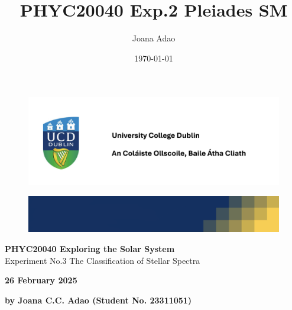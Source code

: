 \documentclass[12pt]{article}
\title{PHYC20040 Exp.2 Pleiades SM}
\author{Joana Adao}
\date{\today}
\begin{document}
\begin{titlepage}
    \begin{center}

        \begin{figure}[ht]
            \includegraphics[width=\textwidth]{UCDLogo.png}
        \end{figure}
        
        \begin{figure}
            \centerline{\includegraphics[width=\paperwidth]{UCDBanner.png}}
        \end{figure}

        \vspace{4cm}

        {\LARGE \bfseries PHYC20040 Exploring the Solar System}\\
        \vspace{0.75cm}
        {\Large Experiment No.3 The Classification of Stellar Spectra}
        
        \vspace{1cm}
    
    {\Large \textbf{26 February 2025}}

    \vspace{2cm}
    
    {\large \textbf{by Joana C.C. Adao (Student No. 23311051)}}\\

    \end{center}
    
   \clearpage

\end{titlepage}

\setcounter{page}{1}
\tableofcontents

\newpage

\begin{abstract}



\end{abstract}
\end{document}
